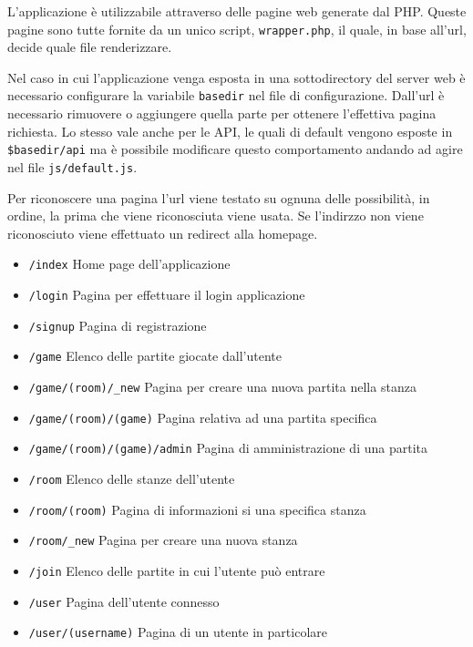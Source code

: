 L'applicazione è utilizzabile attraverso delle pagine web generate dal PHP. Queste pagine sono tutte fornite da un unico script, \texttt{wrapper.php}, il quale, in base all'url, decide quale file renderizzare.

Nel caso in cui l'applicazione venga esposta in una sottodirectory del server web è necessario configurare la variabile \texttt{basedir} nel file di configurazione. Dall'url è necessario rimuovere o aggiungere quella parte per ottenere l'effettiva pagina richiesta. Lo stesso vale anche per le API, le quali di default vengono esposte in \texttt{\$basedir/api} ma è possibile modificare questo comportamento andando ad agire nel file \texttt{js/default.js}.

Per riconoscere una pagina l'url viene testato su ognuna delle possibilità, in ordine, la prima che viene riconosciuta viene usata. Se l'indirzzo non viene riconosciuto viene effettuato un redirect alla homepage.

\begin{itemize}[noitemsep,nolistsep]
	\item \texttt{/index} Home page dell'applicazione
	\item \texttt{/login} Pagina per effettuare il login applicazione
	\item \texttt{/signup} Pagina di registrazione
	\item \texttt{/game} Elenco delle partite giocate dall'utente
	\item \texttt{/game/(room)/\_new} Pagina per creare una nuova partita nella stanza
	\item \texttt{/game/(room)/(game)} Pagina relativa ad una partita specifica
	\item \texttt{/game/(room)/(game)/admin} Pagina di amministrazione di una partita
	\item \texttt{/room} Elenco delle stanze dell'utente
	\item \texttt{/room/(room)} Pagina di informazioni si una specifica stanza
	\item \texttt{/room/\_new} Pagina per creare una nuova stanza
	\item \texttt{/join} Elenco delle partite in cui l'utente può entrare
	\item \texttt{/user} Pagina dell'utente connesso
	\item \texttt{/user/(username)} Pagina di un utente in particolare
\end{itemize}
